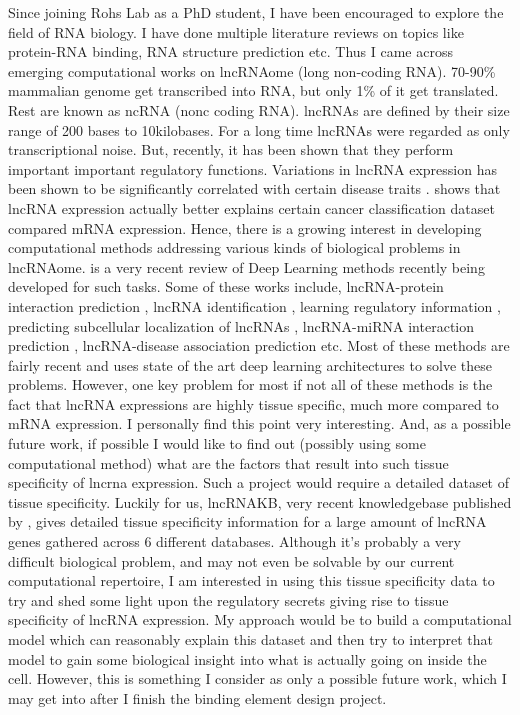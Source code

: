 Since joining Rohs Lab as a PhD student, I have been encouraged to explore the field of RNA biology.
I have done multiple literature reviews on topics like protein-RNA binding, RNA structure
prediction etc. Thus I came across emerging computational works on lncRNAome (long
non-coding RNA). 
70-90\% mammalian genome get transcribed into RNA, but only 1\% of it get translated. Rest are known
as ncRNA (nonc coding RNA). lncRNAs are defined by their size range of 200 bases to 10kilobases.
For a long time lncRNAs were regarded as only transcriptional noise. But, recently, it has been
shown that they perform important important regulatory functions. Variations in lncRNA expression
has been shown to be significantly correlated with certain disease traits \citep{wapinski2011long}. 
\citet{al2019long} shows that lncRNA expression actually better explains certain cancer
classification dataset compared mRNA expression. Hence, there is a growing interest in developing
computational methods addressing various kinds of biological problems in lncRNAome.
\citet{alam2020deep} is a very recent review of Deep Learning methods recently being developed for
such tasks. Some of these works include, lncRNA-protein interaction prediction
\citep{pan2016ipminer, zhao2018bipartite, yi2018deep, zhan2019bgfe, peng2019rpiter}, lncRNA 
identification \citep{baek2018lncrnanet,yang2018lncadeep, tripathi2016deeplnc},
learning regulatory information \citep{alam2019deepcnpp, alam2019deepel}, predicting subcellular
localization of lncRNAs \citep{gudenas2018prediction},    lncRNA-miRNA interaction prediction
\citep{huang2019predicting}, lncRNA-disease association prediction \citep{hu2019deep, xuan2019dual,
al2019long, xuan2019graph} etc. Most of these methods are fairly recent and uses state of the art
deep learning architectures to solve these problems. However, one key problem for most if not all of
these methods is the fact that lncRNA expressions are highly tissue specific, much more compared to
mRNA expression. I personally find this point very interesting. And, as a possible future work, if
possible I would like to find out (possibly using some computational method) what are the factors
that result into such tissue specificity of lncrna expression. Such a project would require a
detailed dataset of tissue specificity. Luckily for us, lncRNAKB,  very recent knowledgebase
published by \citet{seifuddin2020lncrnakb}, gives detailed tissue specificity information  for a large
amount of lncRNA genes gathered across 6 different databases. Although it's probably a very
difficult biological problem, and may not even be solvable by our current computational
repertoire, I am interested in using this tissue specificity data to try and shed some light
upon the regulatory secrets giving rise to tissue specificity of lncRNA expression. My approach
would be to build a computational model which can reasonably explain this dataset and then try to
interpret that model to gain some biological insight into what is actually going on inside the cell. 
However, this is something I consider as only a possible future work, which I may get into after I finish the binding
element design project. 

